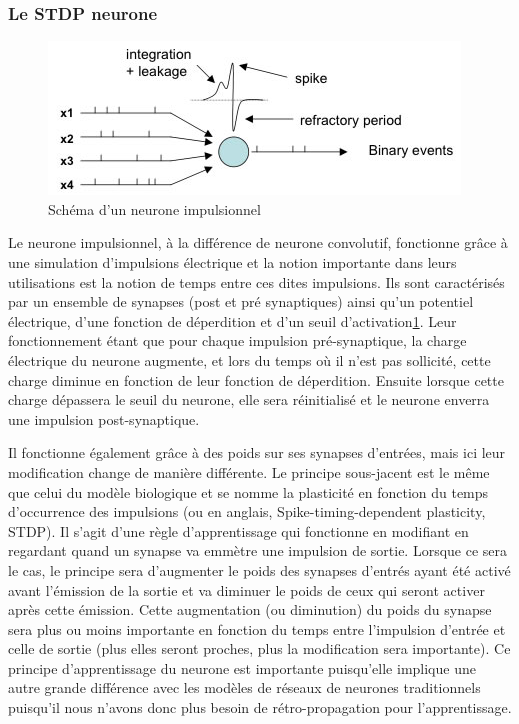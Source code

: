 \documentclass[12pt]{article}
\begin{document}
\subsubsection{Le STDP neurone}

\begin{figure}
	\includegraphics[scale=0.5]{data/neurone.jpg}
    \caption{Schéma d'un neurone impulsionnel}
    \label{neurone}
\end{figure}

Le neurone impulsionnel, à la différence de neurone convolutif, fonctionne grâce à une  simulation d'impulsions électrique et la notion importante dans leurs utilisations est la notion de temps entre ces dites impulsions. Ils sont caractérisés par un ensemble de synapses (post et pré synaptiques) ainsi qu'un potentiel électrique, d'une fonction de déperdition et d'un seuil d'activation\ref{neurone}. Leur fonctionnement étant que pour chaque impulsion pré-synaptique, la charge électrique du neurone augmente, et lors du temps où il n'est pas sollicité, cette charge diminue en fonction de leur fonction de déperdition. Ensuite lorsque cette charge dépassera le seuil du neurone, elle sera réinitialisé et le neurone enverra une impulsion post-synaptique.

Il fonctionne également grâce à des poids sur ses synapses d'entrées, mais ici leur modification change de manière différente. Le principe sous-jacent est le même que celui du modèle biologique et se nomme la plasticité en fonction du temps d’occurrence des impulsions\cite{art5} (ou en anglais, Spike-timing-dependent plasticity, STDP). Il s'agit d'une règle d’apprentissage qui fonctionne en modifiant en regardant quand un synapse va emmètre une impulsion de sortie. Lorsque ce sera le cas, le principe sera d'augmenter le poids des synapses d'entrés ayant été activé avant l’émission de la sortie et va diminuer le poids de ceux qui seront activer après cette émission. Cette augmentation (ou diminution) du poids du synapse sera plus ou moins importante en fonction du temps entre l'impulsion d'entrée et celle de sortie (plus elles seront proches, plus la modification sera importante). Ce principe d'apprentissage du neurone est importante puisqu'elle implique une autre grande différence avec les modèles de réseaux de neurones traditionnels puisqu'il nous n'avons donc plus besoin de rétro-propagation pour l'apprentissage.
\end{document}
